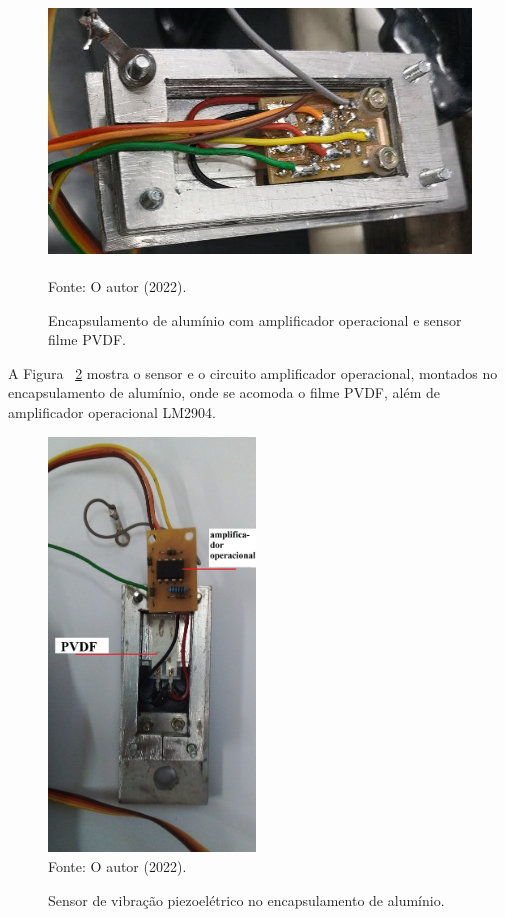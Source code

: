 \documentclass[
	12pt,				
	oneside,			
	a4paper,			
	english,			
	brazil,			
	]{abntex2ppgsi}
\begin{document}
\begin{figure}[H]
\centering
\caption {Encapsulamento de alumínio com amplificador operacional e sensor filme PVDF.}
\includegraphics[width=\textwidth,height=75mm,keepaspectratio]{encapsulamento_sensor} \\
Fonte: O autor (2022).
\label{encapsulamento_sensor}
\end{figure} 

A Figura ~\ref{sensor_e_operacional} mostra o sensor e o circuito amplificador operacional, montados no encapsulamento de alumínio, onde se acomoda o filme PVDF, além de amplificador operacional LM2904.
 
\begin{figure}[H]
\centering
\caption {Sensor de vibração piezoelétrico no encapsulamento de alumínio.}
\includegraphics[width=\textwidth,height=110mm,keepaspectratio]{sensor_e_operacional} \\
Fonte: O autor (2022).
\label{sensor_e_operacional}
\end{figure} 
\end{document}

